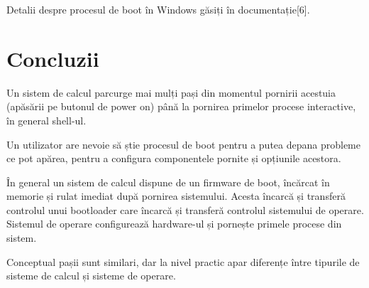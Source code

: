 Detalii despre procesul de boot în Windows găsiți în documentație[6].

\section{Concluzii}
\label{sec:boot-colcuzii}

Un sistem de calcul parcurge mai mulți pași din momentul pornirii acestuia
(apăsării pe butonul de power on) până la pornirea primelor procese interactive,
în general shell-ul.

Un utilizator are nevoie să știe procesul de boot pentru a putea depana probleme
ce pot apărea, pentru a configura componentele pornite și opțiunile acestora.

În general un sistem de calcul dispune de un firmware de boot, încărcat în
memorie și rulat imediat după pornirea sistemului. Acesta încarcă și transferă
controlul unui bootloader care încarcă și transferă controlul sistemului de
operare. Sistemul de operare configurează hardware-ul și pornește primele
procese din sistem.

Conceptual pașii sunt similari, dar la nivel practic apar diferențe între
tipurile de sisteme de calcul și sisteme de operare.
